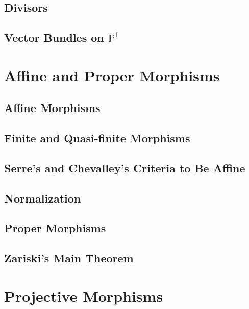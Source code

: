\documentclass[11pt, a4paper]{article}
\begin{document}
\subsection{Divisors}

\subsection{Vector Bundles on $\mathbb{P}^1$}

\section{Affine and Proper Morphisms}

\subsection{Affine Morphisms}

\subsection{Finite and Quasi-finite Morphisms}

\subsection{Serre's and Chevalley's Criteria to Be Affine}

\subsection{Normalization}

\subsection{Proper Morphisms}

\subsection{Zariski's Main Theorem}

\section{Projective Morphisms}
\end{document}
